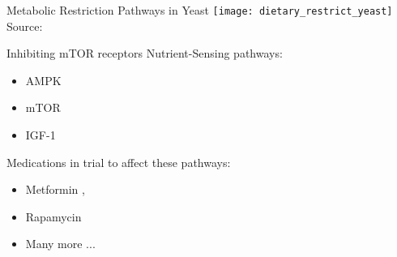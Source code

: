\begin{frame}[c]{Metabolic Restriction Pathways in Yeast}
    \texttt{[image: dietary\_restrict\_yeast]} \\
    Source: \cite{kapahi2017dietary}
\end{frame}

\begin{frame}[c]{Inhibiting mTOR receptors}
    \large
    Nutrient-Sensing pathways:
    \begin{itemize}[<+(1)->]
        \item AMPK
        \item mTOR
        \item IGF-1
    \end{itemize}

    \pause
    Medications in trial to affect these pathways:
    \begin{itemize}[<+(1)->]
        \item Metformin \cite{martin2013metformin}, \cite{TAMETarg47:online}
        \item Rapamycin \cite{Particip66:online}
        \item Many more ...
    \end{itemize}
\end{frame}


% 
% 


